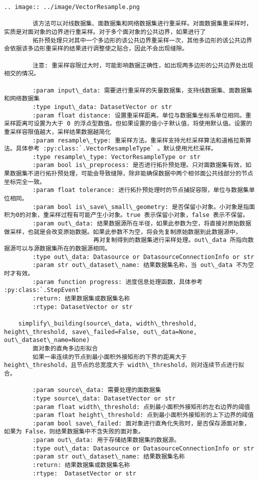 \documentclass[11pt]{article}
\begin{document}
\begin{Verbatim}[commandchars=\\\{\}]
        .. image:: ../image/VectorResample.png
        
        该方法可以对线数据集、面数据集和网络数据集进行重采样。对面数据集重采样时，实质是对面对象的边界进行重采样。对于多个面对象的公共边界，如果进行了
        拓扑预处理只对其中一个多边形的该公共边界重采样一次，其他多边形的该公共边界会依据该多边形重采样的结果进行调整使之贴合，因此不会出现缝隙。
        
        注意: 重采样容限过大时，可能影响数据正确性，如出现两多边形的公共边界处出现相交的情况。
        
        :param input\_data: 需要进行重采样的矢量数据集，支持线数据集、面数据集和网络数据集
        :type input\_data: DatasetVector or str
        :param float distance: 设置重采样距离。单位与数据集坐标系单位相同。重采样距离可设置为大于 0 的浮点型数值。但如果设置的值小于默认值，将使用默认值。设置的重采样容限值越大，采样结果数据越简化
        :param resample\_type: 重采样方法。重采样支持光栏采样算法和道格拉斯算法。具体参考 :py:class:`.VectorResampleType` 。默认使用光栏采样。
        :type resample\_type: VectorResampleType or str
        :param bool is\_preprocess: 是否进行拓扑预处理。只对面数据集有效，如果数据集不进行拓扑预处理，可能会导致缝隙，除非能确保数据中两个相邻面公共线部分的节点坐标完全一致。
        :param float tolerance: 进行拓扑预处理时的节点捕捉容限，单位与数据集单位相同。
        :param bool is\_save\_small\_geometry: 是否保留小对象。小对象是指面积为0的对象，重采样过程有可能产生小对象。true 表示保留小对象，false 表示不保留。
        :param out\_data: 结果数据源所在半径，如果此参数为空，将直接对原始数据做采样，也就是会改变原始数据。如果此参数不为空，将会先复制原始数据到此数据源中，
                         再对复制得到的数据集进行采样处理。out\_data 所指向数据源可以与源数据集所在的数据源相同。
        :type out\_data: Datasource or DatasourceConnectionInfo or str
        :param str out\_dataset\_name: 结果数据集名称，当 out\_data 不为空时才有效。
        :param function progress: 进度信息处理函数，具体参考 :py:class:`.StepEvent`
        :return: 结果数据集或数据集名称
        :rtype: DatasetVector or str
    
    simplify\_building(source\_data, width\_threshold, height\_threshold, save\_failed=False, out\_data=None, out\_dataset\_name=None)
        面对象的直角多边形拟合
        如果一串连续的节点到最小面积外接矩形的下界的距离大于 height\_threshold，且节点的总宽度大于 width\_threshold，则对连续节点进行拟合。
        
        :param source\_data: 需要处理的面数据集
        :type source\_data: DatasetVector or str
        :param float width\_threshold: 点到最小面积外接矩形的左右边界的阈值
        :param float height\_threshold: 点到最小面积外接矩形的上下边界的阈值
        :param bool save\_failed: 面对象进行直角化失败时，是否保存源面对象，如果为 False，则结果数据集中不含失败的面对象。
        :param out\_data: 用于存储结果数据集的数据源。
        :type out\_data: Datasource or DatasourceConnectionInfo or str
        :param str out\_dataset\_name: 结果数据集名称
        :return: 结果数据集或数据集名称
        :rtype:  DatasetVector or str
    

\end{Verbatim}
\end{document}
